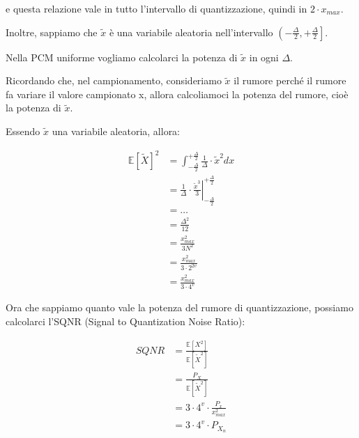 e questa relazione vale in tutto l'intervallo di quantizzazione, quindi in $2 \cdot x_{max}$. \newline 

Inoltre, sappiamo che $\tilde{x}$ è una variabile aleatoria nell'intervallo $\left( - \frac{\Delta}{2} , + \frac{\Delta}{2}\right]$. \newline 

Nella PCM uniforme vogliamo calcolarci la potenza di $\tilde{x}$ in ogni $\Delta$. \newline

Ricordando che, nel campionamento, consideriamo $\tilde{x}$ il rumore perché il rumore fa variare il valore campionato x, 
allora calcoliamoci la potenza del rumore, cioè la potenza di $\tilde{x}$. \newline 

Essendo $\tilde{x}$ una variabile aleatoria, allora: 

{
    \Large 
    \begin{equation}
        \begin{split}
            \mathbb{E} \left[\tilde{X }\right]^{2}
            &=
            \int_{- \frac{\Delta}{2}}^{+ \frac{\Delta}{2}}
            \frac{1}{\Delta} 
            \cdot 
            \tilde{x}^{2}
            dx
            \\
            &=
            \frac{1}{\Delta}
            \cdot 
            \left.
            \frac{\tilde{x}^{3}}{3}
            \right|_{- \frac{\Delta}{2}}^{+ \frac{\Delta}{2}}
            \\
            &= 
            \dots
            \\
            &= 
            \frac{\Delta ^{2}}{12}
            \\
            &=
            \frac{x_{max} ^{2}}{3 N^{2}}
            \\
            &= 
            \frac{x_{max} ^{2}}{3 \cdot 2^{2 v}}
            \\
            &= 
            \frac{x_{max} ^{2}}{3 \cdot 4^{v}}
        \end{split}
    \end{equation}
}


Ora che sappiamo quanto vale la potenza del rumore di quantizzazione, 
possiamo calcolarci l'SQNR (Signal to Quantization Noise Ratio): 

{
    \Large 
    \begin{equation}
        \begin{split}
            SQNR 
            &=
            \frac{\mathbb{E} [X^{2}]}{\mathbb{E} [\tilde{X}^{2}]}
            \\
            &=
            \frac{P_X}{\mathbb{E} [\tilde{X}^{2}]}
            \\
            &= 
            3 \cdot 4^{v} \cdot \frac{P_x}{x_{max} ^{2}}
            \\
            &= 
            3 \cdot 4^{v} \cdot P_{X_n}
        \end{split}
    \end{equation}
}

